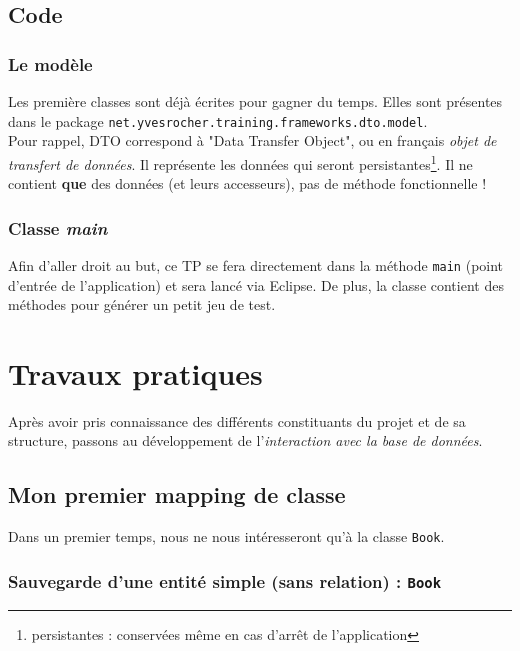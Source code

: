 \documentclass[small,algo]{dushClass}
\begin{document}
\subsection{Code}

\subsubsection{Le modèle}

Les première classes sont déjà écrites pour gagner du temps. Elles sont présentes dans le package \texttt{net.yvesrocher.training.frameworks.dto.model}.\\

Pour rappel, DTO correspond à "Data Transfer Object", ou en français \emph{objet de transfert de données}. Il représente les données qui seront persistantes\footnote{persistantes : conservées même en cas d'arrêt de l'application}. Il ne contient \textbf{que} des données (et leurs accesseurs), pas de méthode fonctionnelle !

\subsubsection{Classe \emph{main}}

Afin d'aller droit au but, ce TP se fera directement dans la méthode \texttt{main} (point d'entrée de l'application) et sera lancé via Eclipse. De plus, la classe contient des méthodes pour générer un petit jeu de test.


\section{Travaux pratiques}

Après avoir pris connaissance des différents constituants du projet et de sa structure, passons au développement de l'\emph{interaction avec la base de données}.

\subsection{Mon premier mapping de classe}

Dans un premier temps, nous ne nous intéresseront qu'à la classe \texttt{Book}.

\subsubsection{Sauvegarde d'une entité simple (sans relation) : \texttt{Book}}
\end{document}
